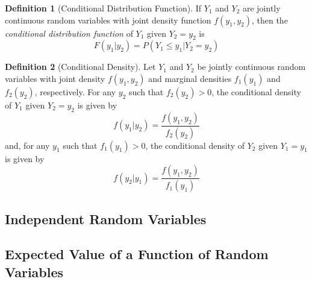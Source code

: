 \documentclass{article}
\theoremstyle{plain}
\theoremstyle{definition}
\newtheorem{defn}{Definition}[section]
\theoremstyle{remark}
\begin{document}
\begin{defn}[Conditional Distribution Function]
If $Y_1$ and $Y_2$ are jointly continuous random variables with joint density function $f(y_1, y_2)$, then the \textit{conditional distribution function} of $Y_1$ given $Y_2 = y_2$ is
$$
F(y_1|y_2) = P(Y_1 \leq y_1|Y_2 = y_2)
$$
\end{defn}

\begin{defn}[Conditional Density]
Let $Y_1$ and $Y_2$ be jointly continuous random variables with joint density $f(y_1, y_2)$ and marginal densities $f_1(y_1)$ and $f_2(y_2)$, respectively. For any $y_2$ such that $f_2(y_2) > 0$, the conditional density of $Y_1$ given $Y_2 = y_2$ is given by
$$
f(y_1|y_2) = \frac{f(y_1,y_2)}{f_2(y_2)}
$$
and, for any $y_1$ such that $f_1(y_1) > 0$, the conditional density of $Y_2$ given $Y_1 = y_1$ is given by
$$
f(y_2|y_1) = \frac{f(y_1,y_2)}{f_1(y_1)}
$$
\end{defn}
\subsection{Independent Random Variables}

\subsection{Expected Value of a Function of Random Variables}
\end{document}
